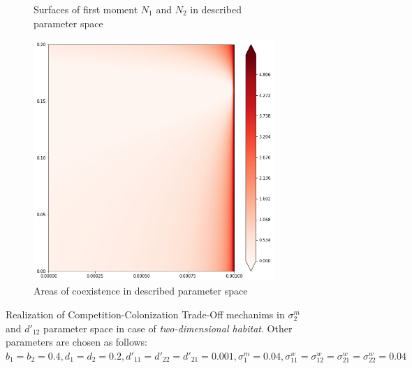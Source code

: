 \begin{figure}
\begin{subfigure}{.5\textwidth}
		\caption{Surfaces of first moment \(N_1\) and \(N_2\) in described parameter space}
		\label{fig:cctod2:sub3}
	\end{subfigure}%
	\begin{subfigure}{.5\textwidth}
		\centering
		\includegraphics[width=.95\linewidth]{ccto_d2_n2.png}
		\caption{Areas of coexistence in described parameter space}
		\label{fig:cctod2:sub4}
	\end{subfigure}
	\caption{Realization of Competition-Colonization Trade-Off mechanims in $\sigma^m_2$ and $d'_{12}$ parameter space in case of \emph{two-dimensional habitat}. Other parameters are chosen as follows:  $b_{1}=b_{2}=0.4
		, d_{1}=d_{2}=0.2
		, d'_{11}=d'_{22}=d'_{21}=0.001,
		\sigma_{1}^{m}=0.04
		, \sigma_{11}^{w}=\sigma_{12}^{w}=\sigma_{21}^{w}=\sigma_{22}^{w}=0.04$}
	\label{fig:cctod2}
\end{figure}


